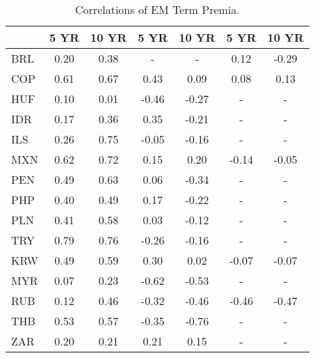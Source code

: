 \begin{tiny}\begin{table}\centering\begin{tabular}{l|cccccc}\toprule & 5 YR & 10 YR & 5 YR & 10 YR & 5 YR & 10 YR \\\midrule BRL & 0.20 & 0.38 & - & - & 0.12 & -0.29 \\COP & 0.61 & 0.67 & 0.43 & 0.09 & 0.08 & 0.13 \\HUF & 0.10 & 0.01 & -0.46 & -0.27 & - & - \\IDR & 0.17 & 0.36 & 0.35 & -0.21 & - & - \\ILS & 0.26 & 0.75 & -0.05 & -0.16 & - & - \\MXN & 0.62 & 0.72 & 0.15 & 0.20 & -0.14 & -0.05 \\PEN & 0.49 & 0.63 & 0.06 & -0.34 & - & - \\PHP & 0.40 & 0.49 & 0.17 & -0.22 & - & - \\PLN & 0.41 & 0.58 & 0.03 & -0.12 & - & - \\TRY & 0.79 & 0.76 & -0.26 & -0.16 & - & - \\KRW & 0.49 & 0.59 & 0.30 & 0.02 & -0.07 & -0.07 \\MYR & 0.07 & 0.23 & -0.62 & -0.53 & - & - \\RUB & 0.12 & 0.46 & -0.32 & -0.46 & -0.46 & -0.47 \\THB & 0.53 & 0.57 & -0.35 & -0.76 & - & - \\ZAR & 0.20 & 0.21 & 0.21 & 0.15 & - & - \\\bottomrule\end{tabular}\caption{Correlations of EM Term Premia.}\label{table:Correls5n10yr}\end{table}\end{tiny}